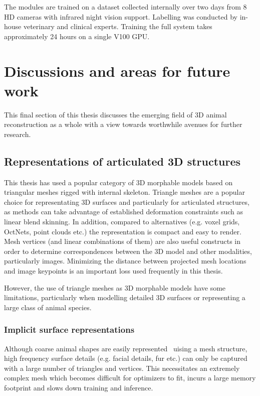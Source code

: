  The modules are trained on a dataset collected internally over two days from 8 HD cameras with infrared night vision support. Labelling was conducted by in-house veterinary and clinical experts. Training the full system takes approximately 24 hours on a single V100 GPU.


\section{Discussions and areas for future work}

This final section of this thesis discusses the emerging field of 3D animal reconstruction as a whole with a view towards worthwhile avenues for further research.

\subsection{Representations of articulated 3D structures}

This thesis has used a popular category of 3D morphable models based on triangular meshes rigged with internal skeleton. Triangle meshes are a popular choice for representating 3D surfaces and particularly for articulated structures, as methods can take advantage of established deformation constraints such as linear blend skinning. In addition, compared to alternatives (e.g. voxel grids, OctNets, point clouds etc.) the representation is compact and easy to render. Mesh vertices (and linear combinations of them) are also useful constructs in order to determine correspondences between the 3D model and other modalities, particularly images. Minimizing the distance between projected mesh locations and image keypoints is an important loss used frequently in this thesis. 

However, the use of triangle meshes as 3D morphable models have some limitations, particularly when modelling detailed 3D surfaces or representing a large class of animal species.

\subsubsection{Implicit surface representations}

Although coarse animal shapes are easily represented~\cite{} uising a mesh structure, high frequency surface details (e.g. facial details, fur etc.) can only be captured with a large number of triangles and vertices. This necessitates an extremely complex mesh which becomes difficult for optimizers to fit, incurs a large memory footprint and slows down training and inference.

